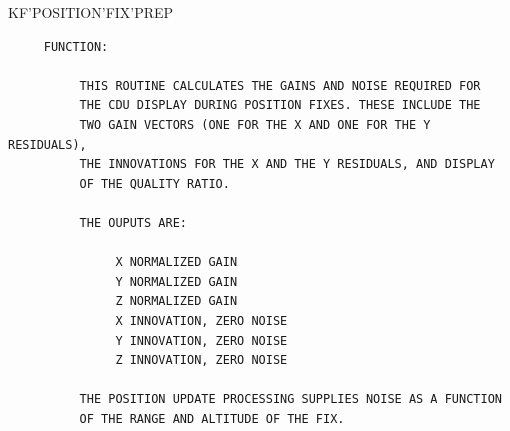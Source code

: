 \begin{frame}
KF'POSITION'FIX'PREP
\begin{verbatim}
     FUNCTION:

          THIS ROUTINE CALCULATES THE GAINS AND NOISE REQUIRED FOR
          THE CDU DISPLAY DURING POSITION FIXES. THESE INCLUDE THE
          TWO GAIN VECTORS (ONE FOR THE X AND ONE FOR THE Y RESIDUALS),
          THE INNOVATIONS FOR THE X AND THE Y RESIDUALS, AND DISPLAY
          OF THE QUALITY RATIO.

          THE OUPUTS ARE:

               X NORMALIZED GAIN
               Y NORMALIZED GAIN
               Z NORMALIZED GAIN
               X INNOVATION, ZERO NOISE
               Y INNOVATION, ZERO NOISE
               Z INNOVATION, ZERO NOISE

          THE POSITION UPDATE PROCESSING SUPPLIES NOISE AS A FUNCTION
          OF THE RANGE AND ALTITUDE OF THE FIX.


\end{verbatim}
\end{frame}
